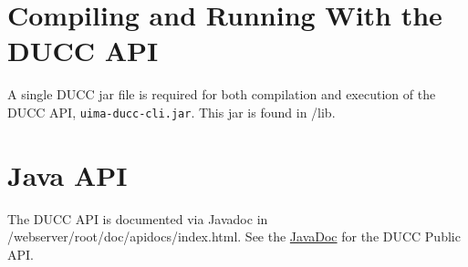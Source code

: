 \section{Compiling and Running With the DUCC API}

   A single DUCC jar file is required for both compilation and execution of the DUCC API,
   {\tt uima-ducc-cli.jar}.  This jar is found in \duccruntime/lib.

\section{Java API}
\ifpdf
   The DUCC API is documented via Javadoc in \ducchome/webserver/root/doc/apidocs/index.html.
\else
   See the \href{apidocs/index.html}{JavaDoc} for the DUCC Public API.
\fi
